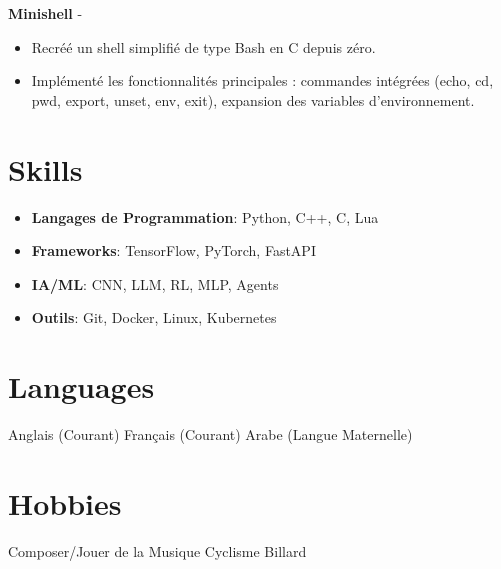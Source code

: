 \documentclass[a4paper,11pt]{article}%
\begin{document}
%
\noindent \textbf{Minishell} - \href{https://github.com/sboof911/minishell}{{}}%
\begin{itemize}[leftmargin=2em,label={},parsep=0pt,topsep=1em]%
\item Recr\'e\'e un shell simplifi\'e de type Bash en C depuis z\'ero.%
\item Impl\'ement\'e les fonctionnalit\'es principales : commandes int\'egr\'ees (echo, cd, pwd, export, unset, env, exit), expansion des variables d'environnement.%
\end{itemize}%
\section*{Skills}%
\begin{itemize}[leftmargin=*]%
\item \textbf{Langages de Programmation}: Python, C++, C, Lua%
\item \textbf{Frameworks}: TensorFlow, PyTorch, FastAPI%
\item \textbf{IA/ML}: CNN, LLM, RL, MLP, Agents%
\item \textbf{Outils}: Git, Docker, Linux, Kubernetes%
\end{itemize}%
\section*{Languages}%
Anglais (Courant)%
\newline%
%
Fran\c{c}ais (Courant)%
\newline%
%
Arabe (Langue Maternelle)%
\newline%
%
\section*{Hobbies}%
Composer/Jouer de la Musique%
\newline%
%
Cyclisme%
\newline%
%
Billard%
\newline%
%
\end{document}
